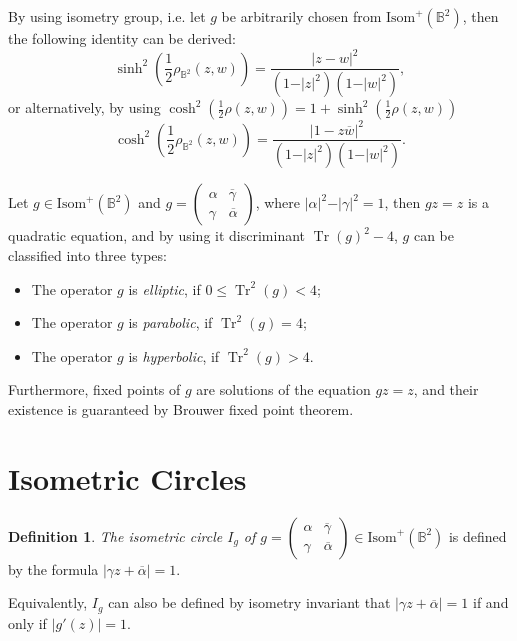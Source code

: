 \documentclass[12pt,oneside]{sfsuthesis}
\theoremstyle{plain} %
\theoremstyle{definition}  %
\newtheorem{definition}{Definition}[chapter]
\theoremstyle{remark}  %
\theoremstyle{plain}
\DeclareMathOperator{\Tr}{Tr}
\begin{document}
{By using isometry group, i.e. let $g$ be arbitrarily chosen from $\text{Isom}^+(\mathbb{B}^2)$, then the following identity can be derived:
\begin{equation}\label{hype eq 2}
\sinh^2\left(\frac{1}{2}\rho_{\mathbb{B}^2}(z,w)\right)=\frac{\vert z-w\vert^2}{\left( 1-\vert z\vert^2\right)\left( 1-\vert w\vert^2\right)},
\end{equation}
or alternatively, by using $ \cosh^2\left(\frac{1}{2}\rho(z,w)\right)=1+\sinh^2\left(\frac{1}{2}\rho(z,w)\right)$
\begin{equation}\label{hype eq 3}
\cosh^2\left(\frac{1}{2}\rho_{\mathbb{B}^2}(z,w)\right)=\frac{\vert 1-z\overline{w}\vert^2}{\left( 1-\vert z\vert^2\right)\left( 1-\vert w\vert^2\right)}.
\end{equation}


Let $g\in\text{Isom}^+(\mathbb{B}^2)$ and $g=\begin{pmatrix}
\alpha&  \overline{\gamma}\\
\gamma &  \overline{\alpha}
\end{pmatrix}$, where $\vert \alpha\vert^2-\vert \gamma\vert^2=1$, then $gz=z$ is a quadratic equation, and by using it discriminant $\Tr(g)^2-4$, $g$ can be classified into three types:
\begin{itemize}
\item The operator $g$ is \textit{elliptic}, if $0\leq \Tr^2(g)<4$;
\item The operator $g$ is \textit{parabolic}, if $\Tr^2(g)=4$;
\item The operator $g$ is \textit{hyperbolic}, if $\Tr^2(g)>4$.
\end{itemize}
Furthermore, fixed points of $g$ are solutions of the equation $gz=z$, and their existence is guaranteed by Brouwer fixed point theorem\cite{munkres2000topology, hatcher2001algebraic, MichaelStarbirdFrancisSu}.

\section{Isometric Circles}

\begin{definition}
\textit{The isometric circle $I_g$ of $g=\begin{pmatrix}
\alpha &  \overline{\gamma}\\
\gamma &  \overline{\alpha}
\end{pmatrix}\in\text{Isom}^+(\mathbb{B}^2)$} is defined by the formula $\vert \gamma z+\overline{\alpha}\vert =1$.
\end{definition}
Equivalently, $I_g$ can also be defined by isometry invariant that $\vert \gamma z+\overline{\alpha}\vert =1$ if and only if $\vert g'(z)\vert=1$.

}
\end{document}
